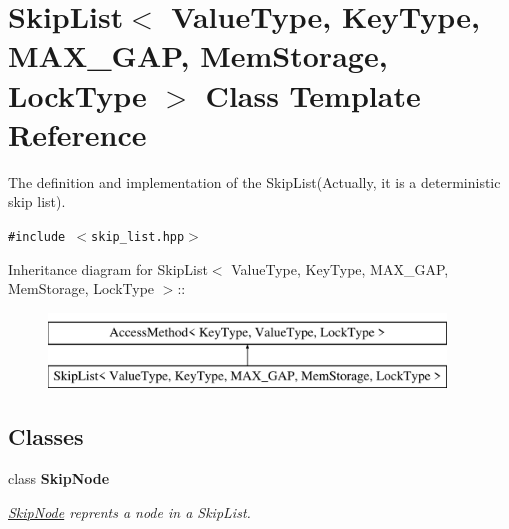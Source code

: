 \hypertarget{classSkipList_3_01ValueType_00_01KeyType_00_01MAX__GAP_00_01MemStorage_00_01LockType_01_4}{
\section{SkipList$<$ ValueType, KeyType, MAX\_\-GAP, MemStorage, LockType $>$ Class Template Reference}
\label{classSkipList_3_01ValueType_00_01KeyType_00_01MAX__GAP_00_01MemStorage_00_01LockType_01_4}
}
The definition and implementation of the SkipList(Actually, it is a deterministic skip list).  


{\tt \#include $<$skip\_\-list.hpp$>$}

Inheritance diagram for SkipList$<$ ValueType, KeyType, MAX\_\-GAP, MemStorage, LockType $>$::\begin{figure}[H]
\begin{center}
\leavevmode
\includegraphics[height=2cm]{classSkipList_3_01ValueType_00_01KeyType_00_01MAX__GAP_00_01MemStorage_00_01LockType_01_4}
\end{center}
\end{figure}
\subsection*{Classes}
\begin{CompactItemize}
\item 
class \textbf{SkipNode}
\begin{CompactList}\small\item\em \hyperlink{classSkipNode}{SkipNode} reprents a node in a SkipList. \item\end{CompactList}\end{CompactItemize}
